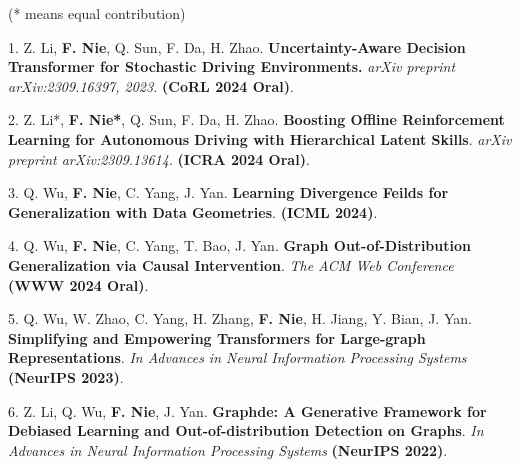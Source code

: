 \documentclass{chicv}
\begin{document}
\begin{compactlist}
	\item (* means equal contribution)
	
	\item 1. Z. Li, \textbf{F. Nie}, Q. Sun, F. Da, H. Zhao. \textbf{Uncertainty-Aware Decision Transformer for Stochastic Driving Environments.} \textit{arXiv preprint arXiv:2309.16397, 2023.}
	\vspace{0.2cm} \textbf{(CoRL  2024 Oral)}.
	
	\item 2. Z. Li*, \textbf{F. Nie*}, Q. Sun, F. Da, H. Zhao. \textbf{Boosting Offline Reinforcement Learning for Autonomous Driving with Hierarchical Latent Skills}. \textit{arXiv preprint arXiv:2309.13614}. \textbf{(ICRA  2024 Oral)}.
	\vspace{0.2cm}
	
	\item 3. Q. Wu, \textbf{F. Nie}, C. Yang, J. Yan. \textbf{Learning Divergence Feilds for Generalization with Data Geometries}. \textbf{(ICML 2024)}.
	\vspace{0.2cm}
	
	\item 4.  Q. Wu, \textbf{F. Nie}, C. Yang, T. Bao, J. Yan. \textbf{Graph Out-of-Distribution Generalization via Causal Intervention}. \textit{The ACM Web Conference} \textbf{(WWW  2024 Oral)}.
	\vspace{0.2cm}
	
	\vspace{0.2cm}
	
	\item 5. Q. Wu, W. Zhao, C. Yang, H. Zhang, \textbf{F. Nie}, H. Jiang, Y. Bian, J. Yan. \textbf{Simplifying and Empowering Transformers for Large-graph Representations}. \textit{In Advances in Neural Information Processing Systems} \textbf{(NeurIPS  2023)}.
	\vspace{0.2cm}
	
	\item 6. Z. Li, Q. Wu, \textbf{F. Nie}, J. Yan. \textbf{Graphde: A Generative Framework for Debiased Learning and Out-of-distribution Detection on Graphs}. \textit{In Advances in Neural Information Processing Systems} \textbf{(NeurIPS  2022)}.
\end{compactlist}
\end{document}
